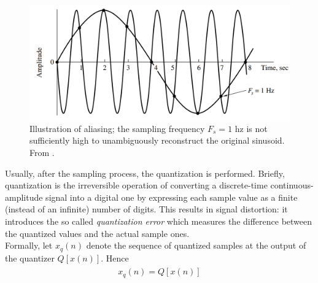 \begin{figure}[H]
	\begin{center}
		\includegraphics[scale=0.4]{img/aliasing.png}
		\captionsetup{margin=2cm}
		\caption{ Illustration of aliasing; the sampling frequency $F_{s} = 1$ \gls{hz} is not sufficiently high to unambiguously reconstruct the original sinusoid. From \cite{proakis2006dimitris}.} 
		\label{fig:aliasing}
	\end{center}
\end{figure}

\noindent Usually, after the sampling process, the quantization is performed. Briefly, quantization is the irreversible operation of converting a discrete-time continuous-amplitude signal into a digital one by expressing each sample value as a finite (instead of an infinite) number of digits. This results in signal distortion: it introduces the so called \textit{quantization error} which measures the difference between the quantized values and the actual sample ones. \\
Formally, let $x_{q}(n)$ denote the sequence of quantized samples at the output of the quantizer $Q[x(n)]$. Hence
\begin{align}\label{eq:quantizer}
	\begin{array}{c}
		x_{q}(n)=Q[x(n)]
	\end{array}
\end{align}

